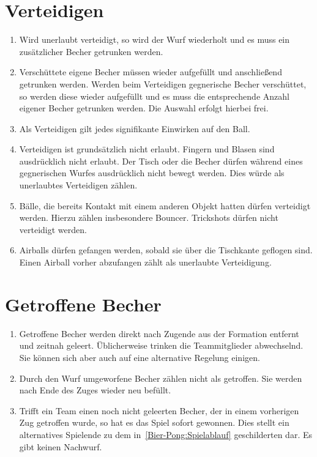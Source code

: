 \section{Verteidigen}\label{Bier-Pong:Verteidigen}
\begin{enumerate}[label={(\arabic*)}]
    \item
    Wird unerlaubt verteidigt, so wird der Wurf wiederholt und es muss ein zusätzlicher Becher getrunken werden.

    \item
    Verschüttete eigene Becher müssen wieder aufgefüllt und anschließend getrunken werden.
    Werden beim Verteidigen gegnerische Becher verschüttet, so werden diese wieder aufgefüllt und es muss die entsprechende Anzahl eigener Becher getrunken werden.
    Die Auswahl erfolgt hierbei frei.

    \item
    Als Verteidigen gilt jedes signifikante Einwirken auf den Ball.

    \item
    Verteidigen ist grundsätzlich nicht erlaubt.
    Fingern und Blasen sind ausdrücklich nicht erlaubt.
    Der Tisch oder die Becher dürfen während eines gegnerischen Wurfes ausdrücklich nicht bewegt werden.
    Dies würde als unerlaubtes Verteidigen zählen.

    \item
    Bälle, die bereits Kontakt mit einem anderen Objekt hatten dürfen verteidigt werden.
    Hierzu zählen insbesondere Bouncer.
    Trickshots dürfen nicht verteidigt werden.

    \item
    Airballs dürfen gefangen werden, sobald sie über die Tischkante geflogen sind.
    Einen Airball vorher abzufangen zählt als unerlaubte Verteidigung.
\end{enumerate}

\section{Getroffene Becher}
\begin{enumerate}[label={(\arabic*)}]
    \item
    Getroffene Becher werden direkt nach Zugende aus der Formation entfernt und zeitnah geleert.
    Üblicherweise trinken die Teammitglieder abwechselnd.
    Sie können sich aber auch auf eine alternative Regelung einigen.

    \item
    Durch den Wurf umgeworfene Becher zählen nicht als getroffen.
    Sie werden nach Ende des Zuges wieder neu befüllt.

    \item
    Trifft ein Team einen noch nicht geleerten Becher, der in einem vorherigen Zug getroffen wurde, so hat es das Spiel sofort gewonnen.
    Dies stellt ein alternatives Spielende zu dem in~\ref{Bier-Pong:Spielablauf} geschilderten dar.
    Es gibt keinen Nachwurf.
\end{enumerate}

